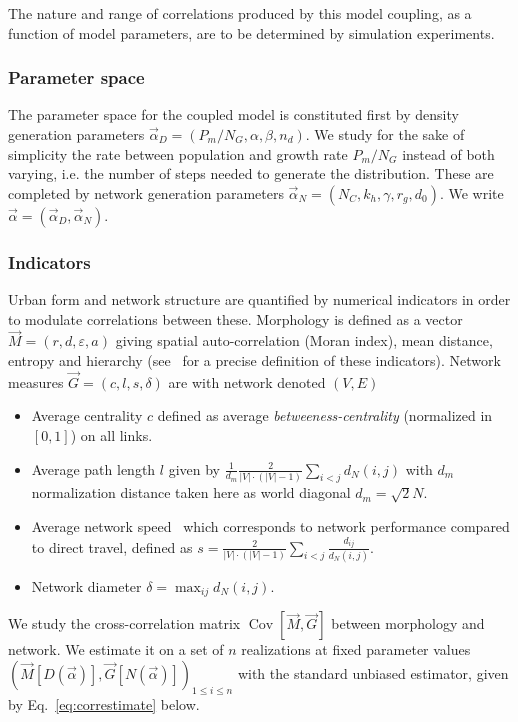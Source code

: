\documentclass{article}
\DeclareMathOperator{\Cov}{Cov}
\newcommand{\Covb}[2]{\ensuremath{\Cov\!\left[#1,#2\right]}}
\begin{document}
The nature and range of correlations produced by this model coupling, as a function of model parameters, are to be determined by simulation experiments.


\subsubsection*{Parameter space}

The parameter space for the coupled model is constituted first by density generation parameters $\vec{\alpha}_D = (P_m/N_G , \alpha,\beta , n_d)$. We study for the sake of simplicity the rate between population and growth rate $P_m/N_G$ instead of both varying, i.e. the number of steps needed to generate the distribution. These are completed by network generation parameters $\vec{\alpha}_N=(N_C,k_h,\gamma , r_g , d_0)$. We write $\vec{\alpha} = (\vec{\alpha}_D,\vec{\alpha}_N)$.


\subsubsection*{Indicators}

Urban form and network structure are quantified by numerical indicators in order to modulate correlations between these. Morphology is defined as a vector $\vec{M}=(r,d,\varepsilon,a)$ giving spatial auto-correlation (Moran index), mean distance, entropy and hierarchy (see~\cite{le2015forme} for a precise definition of these indicators). Network measures $\vec{G} = (c,l,s,\delta)$ are with network denoted $(V,E)$
\begin{itemize}
\item Average centrality $c$ defined as average \emph{betweeness-centrality} (normalized in $[0,1]$) on all links.
\item Average path length $l$ given by $\frac{1}{d_m}\frac{2}{|V|\cdot (|V|-1)}\sum_{i<j}d_N(i,j)$ with $d_m$ normalization distance taken here as world diagonal $d_m=\sqrt{2}N$.
\item Average network speed~\cite{banos2012towards} which corresponds to network performance compared to direct travel, defined as $s = \frac{2}{|V|\cdot (|V|-1)}\sum_{i<j}{\frac{d_{ij}}{d_N(i,j)}}$.
\item Network diameter $\delta = \max_{ij}d_N(i,j)$.
\end{itemize}



We study the cross-correlation matrix $\Covb{\vec{M}}{\vec{G}}$ between morphology and network. We estimate it on a set of $n$ realizations at fixed parameter values $(\vec{M}\left[D(\vec{\alpha})\right],\vec{G}\left[N(\vec{\alpha})\right])_{1\leq i\leq n}$ with the standard unbiased estimator, given by Eq.~\ref{eq:correstimate} below.
\end{document}
